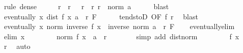 \begin{isabellebody}
\ {\isacharparenleft}{\kern0pt}rule\ dense{\isacharparenright}{\kern0pt}\isanewline
\ \ \isamarkupfalse%
\ \isamarkupfalse%
\ r\ \ r{}{\isacharcolon}{\kern0pt}\ {\isachardoublequoteopen}{}\ {\isacharless}{\kern0pt}\ r{\isachardoublequoteclose}\ \ r{}{\isacharcolon}{\kern0pt}\ {\isachardoublequoteopen}r\ {\isacharless}{\kern0pt}\ norm\ a{\isachardoublequoteclose}\isanewline
\ \ \ \ \isamarkupfalse%
\ blast\isanewline
\ \ \isamarkupfalse%
\ {\isachardoublequoteopen}eventually\ {\isacharparenleft}{\kern0pt}{\isasymlambda}x{\isachardot}{\kern0pt}\ dist\ {\isacharparenleft}{\kern0pt}f\ x{\isacharparenright}{\kern0pt}\ a\ {\isacharless}{\kern0pt}\ r{\isacharparenright}{\kern0pt}\ F{\isachardoublequoteclose}\isanewline
\ \ \ \ \isamarkupfalse%
\ tendstoD\ {\isacharbrackleft}{\kern0pt}OF\ f\ r{}{\isacharbrackright}{\kern0pt}\ \isamarkupfalse%
\ blast\isanewline
\ \ \isamarkupfalse%
\ \isamarkupfalse%
\ {\isachardoublequoteopen}eventually\ {\isacharparenleft}{\kern0pt}{\isasymlambda}x{\isachardot}{\kern0pt}\ norm\ {\isacharparenleft}{\kern0pt}inverse\ {\isacharparenleft}{\kern0pt}f\ x{\isacharparenright}{\kern0pt}{\isacharparenright}{\kern0pt}\ {\isasymle}\ inverse\ {\isacharparenleft}{\kern0pt}norm\ a\ {\isacharminus}{\kern0pt}\ r{\isacharparenright}{\kern0pt}{\isacharparenright}{\kern0pt}\ F{\isachardoublequoteclose}\isanewline
\ \ \isamarkupfalse%
\ eventually{\isacharunderscore}{\kern0pt}elim\isanewline
\ \ \ \ \isamarkupfalse%
\ {\isacharparenleft}{\kern0pt}elim\ x{\isacharparenright}{\kern0pt}\isanewline
\ \ \ \ \isamarkupfalse%
\ \isamarkupfalse%
\ {}{\isacharcolon}{\kern0pt}\ {\isachardoublequoteopen}norm\ {\isacharparenleft}{\kern0pt}f\ x\ {\isacharminus}{\kern0pt}\ a{\isacharparenright}{\kern0pt}\ {\isacharless}{\kern0pt}\ r{\isachardoublequoteclose}\isanewline
\ \ \ \ \ \ \isamarkupfalse%
\ {\isacharparenleft}{\kern0pt}simp\ add{\isacharcolon}{\kern0pt}\ dist{\isacharunderscore}{\kern0pt}norm{\isacharparenright}{\kern0pt}\isanewline
\ \ \ \ \isamarkupfalse%
\ \isamarkupfalse%
\ {}{\isacharcolon}{\kern0pt}\ {\isachardoublequoteopen}f\ x\ {\isasymnoteq}\ {}{\isachardoublequoteclose}\ \isamarkupfalse%
\ r{}\ \isamarkupfalse%
\ auto\isanewline
\ \ \ \ \isamarkupfalse%

\end{isabellebody}
